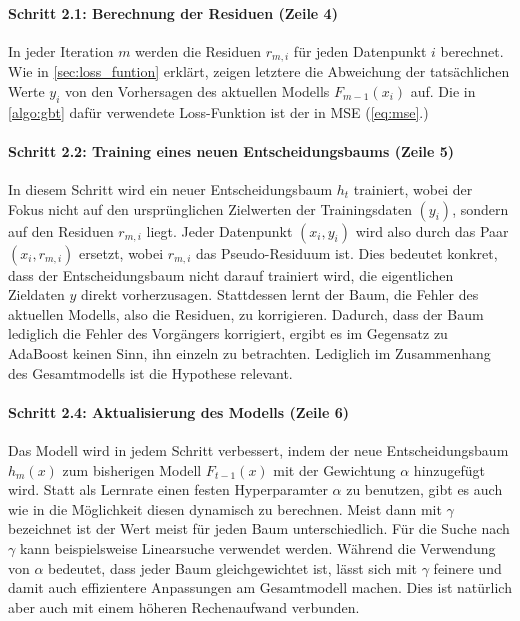 \paragraph{Schritt 2.1: Berechnung der Residuen (Zeile 4)}
In jeder Iteration \( m \) werden die Residuen \( r_{m,i} \) für jeden Datenpunkt \( i \) berechnet. Wie in \autoref{sec:loss_funtion} erklärt, zeigen letztere die Abweichung der tatsächlichen Werte \( y_i \) von den Vorhersagen des aktuellen Modells \( F_{m-1}(x_i) \) auf. Die in \autoref{algo:gbt} dafür verwendete Loss-Funktion ist der in MSE (\ref{eq:mse}.)

\paragraph{Schritt 2.2: Training eines neuen Entscheidungsbaums (Zeile 5)}
\label{para:GBT_training_tree}
In diesem Schritt wird ein neuer Entscheidungsbaum \( h_t \) trainiert, wobei der Fokus nicht auf den ursprünglichen Zielwerten der Trainingsdaten \( (y_i) \), sondern auf den Residuen \( r_{m,i} \) liegt. Jeder Datenpunkt \( (x_i, y_i) \) wird also durch das Paar \( (x_i, r_{m,i}) \) ersetzt, wobei \( r_{m,i} \) das Pseudo-Residuum ist.
\newline
Dies bedeutet konkret, dass der Entscheidungsbaum nicht darauf trainiert wird, die eigentlichen Zieldaten \( y \) direkt vorherzusagen. Stattdessen lernt der Baum, die Fehler des aktuellen Modells, also die Residuen, zu korrigieren. Dadurch, dass der Baum lediglich die Fehler des Vorgängers korrigiert, ergibt es im Gegensatz zu AdaBoost keinen Sinn, ihn einzeln zu betrachten. Lediglich im Zusammenhang des Gesamtmodells ist die Hypothese relevant.

\paragraph{Schritt 2.4: Aktualisierung des Modells (Zeile 6)}
Das Modell wird in jedem Schritt verbessert, indem der neue Entscheidungsbaum \( h_m(x) \) zum bisherigen Modell \( F_{t-1}(x) \) mit der Gewichtung \( \alpha \) hinzugefügt wird. Statt als Lernrate einen festen Hyperparamter \( \alpha \) zu benutzen, gibt es auch wie in \textcite[S.~345]{Frochte2020} die Möglichkeit diesen dynamisch zu berechnen. Meist dann mit \( \gamma \) bezeichnet ist der Wert meist für jeden Baum unterschiedlich. Für die Suche nach \( \gamma \) kann beispielsweise Linearsuche verwendet werden.
\newline
\newline
Während die Verwendung von \( \alpha \) bedeutet, dass jeder Baum gleichgewichtet ist, lässt sich mit \( \gamma \) feinere und damit auch effizientere Anpassungen am Gesamtmodell machen. Dies ist natürlich aber auch mit einem höheren Rechenaufwand verbunden.

